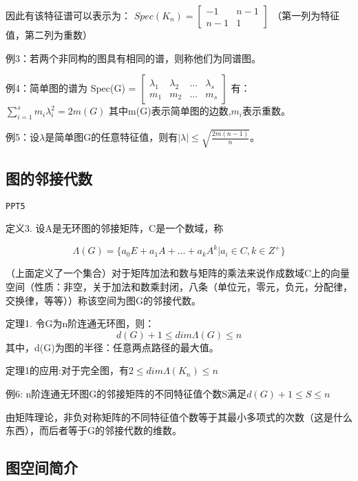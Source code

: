 \documentclass{article}
\begin{document}
因此有该特征谱可以表示为：
$Spec(K_n) = $\begin{math}
	\left[
	\begin{smallmatrix}
	-1 & n-1 \\
	n-1 & 1
	\end{smallmatrix}
	\right]
\end{math} （第一列为特征值，第二列为重数）

例3：若两个非同构的图具有相同的谱，则称他们为同谱图。

例4：简单图的谱为 Spec(G) = 
\begin{math}
	\left[
	\begin{smallmatrix}
	\lambda_1 & \lambda_2 & ... & \lambda_s \\
	m_1 & m_2 & ... & m_s
	\end{smallmatrix}
	\right]
	\end{math} 有： $\sum_{i=1}^{s}m_i\lambda_i^2 = 2m(G)$ 其中m(G)表示简单图的边数,$m_i$表示重数。

例5：设$\lambda$是简单图G的任意特征值，则有$|\lambda| \le \sqrt{\frac{2m(n-1)}{n}}$。

\subsection{图的邻接代数}

\texttt{PPT5}

定义3. 设A是无环图的邻接矩阵，C是一个数域，称

$$\Lambda(G) = \{ a_0E + a_1A + ... + a_k A^k | a_i \in C, k \in Z^+ \}$$

（上面定义了一个集合）对于$\textbf{矩阵加法和数与矩阵的乘法}$来说作成数域C上的向量空间（性质：非空，关于加法和数乘封闭，八条（单位元，零元，负元，分配律，交换律，等等））称该空间为图G的邻接代数。

定理1. 令G为n阶连通无环图，则：$$ d(G) + 1 \le dim \Lambda (G) \le n$$ 其中，d(G)为图的半径：任意两点路径的最大值。

定理1的应用:对于完全图，有$2 \le dim \Lambda (K_n) \le n$

例6: n阶连通无环图G的邻接矩阵的不同特征值个数S满足$ d(G) + 1 \le S \le n$

由矩阵理论，非负对称矩阵的不同特征值个数等于其最小多项式的次数（这是什么东西），而后者等于G的邻接代数的维数。

\subsection{图空间简介}
\end{document}

